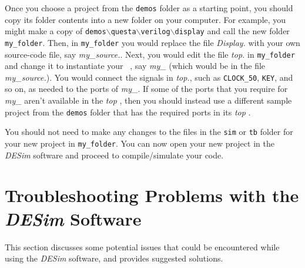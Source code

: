 Once you choose a project from the \texttt{demos} folder as a starting point, you should
copy its folder contents into a new folder on your computer. For example, you might make a copy of
\texttt{demos$\backslash$questa$\backslash$verilog$\backslash$display} and call the new folder 
\texttt{my\_folder}. Then, in
\texttt{my\_folder} you would replace the file {\it Display.\hdlFileExt} with your own source-code 
file, say {\it my\_source.\hdlFileExt}. Next, you would edit the file {\it top.\hdlFileExt} in 
\texttt{my\_folder} and change it to instantiate your \hdlName~\hdlModuleName, say {\it my\_\hdlModuleName} (which 
would be in the file {\it my\_source.\hdlFileExt}). You would connect 
the signals in {\it top.\hdlFileExt}, such as \texttt{CLOCK\_50}, \texttt{KEY}, and so on, 
as needed to the ports of {\it my\_\hdlModuleName}. If some of the ports that you require for 
{\it my\_\hdlModuleName} aren't available in the {\it top} \hdlModuleName, then you should instead use
a different sample project from the \texttt{demos} folder that has the required 
ports in its {\it top} \hdlModuleName.  

You should not need to make any changes to the files in the \texttt{sim} or \texttt{tb} folder 
for your new project in \texttt{my\_folder}. You can now open your new project in the
{\it DESim} software and proceed to compile/simulate your code. 

\newpage
\section{Troubleshooting Problems with the {\it DESim} Software}

This section discusses some potential issues that could be encountered while using the
{\it DESim} software, and provides suggested solutions.


